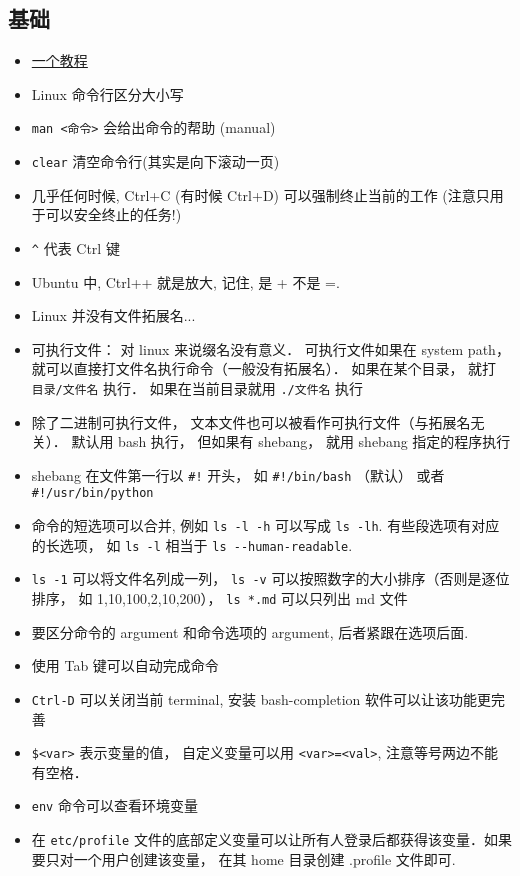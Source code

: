 
\subsection{基础}
\begin{itemize}
\item \href{http://faculty.salina.k-state.edu/tim/unix_sg/index.html}{一个教程}
\item Linux 命令行区分大小写
\item \verb`man <命令>`  会给出命令的帮助 (manual)
\item \verb`clear` 清空命令行(其实是向下滚动一页)
\item 几乎任何时候, Ctrl+C (有时候 Ctrl+D) 可以强制终止当前的工作 (注意只用于可以安全终止的任务!)
\item \verb`^` 代表 Ctrl 键
\item Ubuntu 中, Ctrl++ 就是放大, 记住, 是 + 不是 =.
\item Linux 并没有文件拓展名...
\item 可执行文件： 对 linux 来说缀名没有意义． 可执行文件如果在 system path， 就可以直接打文件名执行命令（一般没有拓展名）． 如果在某个目录， 就打 \verb`目录/文件名` 执行． 如果在当前目录就用 \verb`./文件名` 执行
\item 除了二进制可执行文件， 文本文件也可以被看作可执行文件（与拓展名无关）． 默认用 bash 执行， 但如果有 shebang， 就用 shebang 指定的程序执行
\item shebang 在文件第一行以 \verb`#!` 开头， 如 \verb`#!/bin/bash` （默认） 或者 \verb`#!/usr/bin/python`
\item 命令的短选项可以合并, 例如 \verb`ls -l -h` 可以写成 \verb`ls -lh`. 有些段选项有对应的长选项， 如 \verb`ls -l` 相当于 \verb`ls --human-readable`.
\item \verb`ls -1` 可以将文件名列成一列， \verb`ls -v` 可以按照数字的大小排序（否则是逐位排序， 如 1,10,100,2,10,200）， \verb`ls *.md` 可以只列出 md 文件
\item 要区分命令的 argument 和命令选项的 argument, 后者紧跟在选项后面.
\item 使用 Tab 键可以自动完成命令
\item \verb`Ctrl-D` 可以关闭当前 terminal, 安装 bash-completion 软件可以让该功能更完善
\item \verb`$<var>` 表示变量的值， 自定义变量可以用 \verb`<var>=<val>`, 注意等号两边不能有空格．
\item \verb`env` 命令可以查看环境变量
\item 在 \verb`etc/profile` 文件的底部定义变量可以让所有人登录后都获得该变量．如果要只对一个用户创建该变量， 在其 home 目录创建 .profile 文件即可.

\end{itemize}
